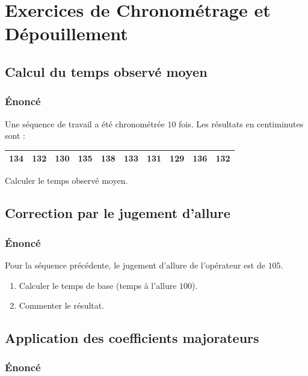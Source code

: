 \documentclass[a4paper,12pt]{article}
\begin{document}
\section{Exercices de Chronométrage et Dépouillement}

\subsection{Calcul du temps observé moyen}

\subsubsection*{Énoncé}

Une séquence de travail a été chronométrée $10$ fois. Les résultats en centiminutes sont :

\begin{center}
\begin{tabular}{|c|c|c|c|c|c|c|c|c|c|}
\hline
134 & 132 & 130 & 135 & 138 & 133 & 131 & 129 & 136 & 132 \\
\hline
\end{tabular}
\end{center}

Calculer le temps observé moyen.

\subsection{Correction par le jugement d'allure}

\subsubsection*{Énoncé}

Pour la séquence précédente, le jugement d'allure de l'opérateur est de $105$.

\begin{enumerate}
    \item Calculer le temps de base (temps à l'allure $100$).
    \item Commenter le résultat.
\end{enumerate}

\subsection{Application des coefficients majorateurs}

\subsubsection*{Énoncé}
\end{document}
